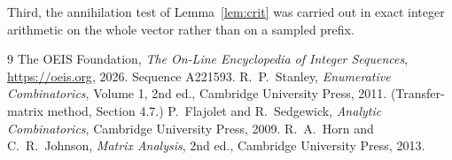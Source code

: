 \documentclass[11pt,a4paper]{article}
\theoremstyle{plain}
\theoremstyle{definition}
\begin{document}
Third, the annihilation test of Lemma~\ref{lem:crit} was carried out in exact integer
arithmetic on the whole vector rather than on a sampled prefix.

\begin{thebibliography}{9}
 The OEIS Foundation, \emph{The On-Line Encyclopedia of Integer
Sequences}, \url{https://oeis.org}, 2026. Sequence A221593.
 R.~P.~Stanley, \emph{Enumerative Combinatorics}, Volume 1, 2nd ed.,
Cambridge University Press, 2011. (Transfer-matrix method, Section 4.7.)
 P.~Flajolet and R.~Sedgewick, \emph{Analytic Combinatorics}, Cambridge
University Press, 2009.
 R.~A.~Horn and C.~R.~Johnson, \emph{Matrix Analysis}, 2nd ed., Cambridge
University Press, 2013.
\end{thebibliography}
\end{document}
